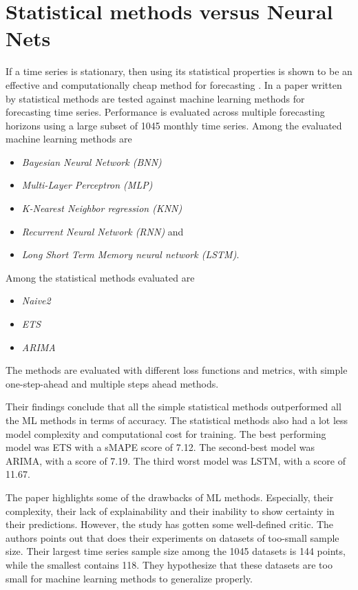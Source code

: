 \section{Statistical methods versus Neural Nets}
\label{section:RelatedWork:Statistical-NN}

If a time series is stationary, then using its statistical properties is shown to be an effective and computationally cheap method for forecasting
\cite{Makridakis2018}.
In a paper written by \citeauthor{Makridakis2018} statistical methods are tested against machine learning methods for
forecasting time series.
Performance is evaluated across multiple forecasting horizons using a large subset of 1045 monthly time series.
Among the evaluated machine learning methods are

\begin{itemize}
  \item \textit{Bayesian Neural Network (BNN)}
  \item \textit{Multi-Layer Perceptron (MLP)}
  \item \textit{K-Nearest Neighbor regression (KNN)}
  \item \textit{Recurrent Neural Network (RNN)} and
  \item \textit{Long Short Term Memory neural network (LSTM)}.
\end{itemize}

Among the statistical methods evaluated are

\begin{itemize}
  \item \textit{Naive2}
  \item \textit{ETS}
  \item \textit{ARIMA}
\end{itemize}
The methods are evaluated with different loss functions and metrics, with simple one-step-ahead and multiple steps ahead methods.

Their findings conclude that all the simple statistical methods outperformed all the ML methods in terms of accuracy.
The statistical methods also had a lot less model complexity and computational cost for training.
The best performing model was ETS with a sMAPE score of 7.12.
The second-best model was ARIMA, with a score of 7.19.
The third worst model was LSTM, with a score of 11.67.

The paper \cite{Makridakis2018} highlights some of the drawbacks of ML methods. Especially, their complexity,
their lack of explainability and their inability to show certainty in their predictions.
However, the study has gotten some well-defined critic. The authors \citeauthor*{Cerqueira2019} points
out that \cite{Makridakis2018} does their experiments on datasets of too-small sample size.
Their largest time series sample size among the 1045 datasets is 144 points, while the smallest contains 118.
They hypothesize that these datasets are too small for machine learning methods to generalize properly.

